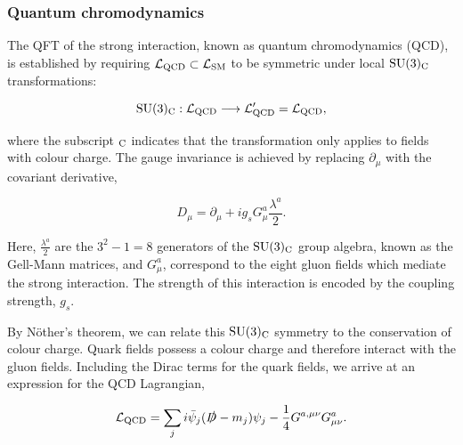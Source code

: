 \subsubsection{Quantum chromodynamics}
The QFT of the strong interaction, known as quantum chromodynamics (QCD), is established by requiring $\mathcal{L}_{\rm{QCD}} \subset \mathcal{L}_{\rm{SM}}$ to be symmetric under local ${\rm{SU}}(3)_{\rm{C}}$ transformations:

\begin{equation}
    {\rm{SU}}(3)_{\rm{C}}: \mathcal{L}_{\rm{QCD}} \longrightarrow \mathcal{L}'_{\rm{QCD}} = \mathcal{L}_{\rm{QCD}},
\end{equation}

\noindent
where the subscript ${}_{\rm{C}}$ indicates that the transformation only applies to fields with colour charge. The gauge invariance is achieved by replacing $\partial_\mu$ with the covariant derivative, 

\begin{equation}
    D_\mu = \partial_\mu + i g_s G^a_\mu \frac{\lambda^a}{2}.
\end{equation}

\noindent
Here, $\frac{\lambda^a}{2}$ are the $3^2-1=8$ generators of the ${\rm{SU}}(3)_{\rm{C}}$ group algebra, known as the Gell-Mann matrices, and $G^a_\mu$, correspond to the eight gluon fields which mediate the strong interaction. The strength of this interaction is encoded by the coupling strength, $g_s$.

By N\"{o}ther's theorem, we can relate this ${\rm{SU}}(3)_{\rm{C}}$ symmetry to the conservation of colour charge. Quark fields possess a colour charge and therefore interact with the gluon fields. Including the Dirac terms for the quark fields, we arrive at an expression for the QCD Lagrangian,

\begin{equation}
    \mathcal{L}_{\rm{QCD}} = \sum_j i\bar{\psi}_j(\slashed{D}-m_j)\psi_j - \frac{1}{4} G^{a,\mu\nu}G^a_{\mu\nu}.
\end{equation}


